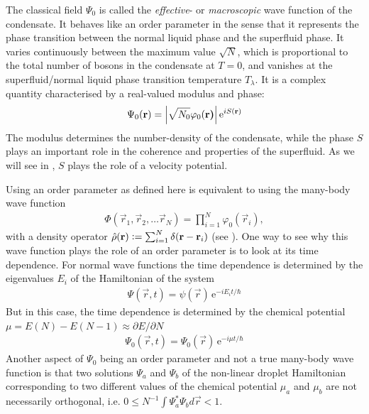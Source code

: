 			The classical field $\Psi_0$ is called the \emph{effective}- or \emph{macroscopic} wave function of the condensate. It behaves like an order parameter in the sense that it represents the phase transition between the normal liquid phase and the superfluid phase. It varies continuously between the maximum value $\sqrt{N}$, which is proportional to the total number of bosons in the condensate at $T=0$, and vanishes at the superfluid/normal liquid phase transition temperature $T_\lambda$. It is a complex quantity characterised by a real-valued modulus and phase:
			\begin{align}
				\Psi_0(\vec{r}) = \absolutevalue{\sqrt{N_0}\varphi_0(\vec{r)}}\,\mathrm{e}^{iS(\vec{r})}\label{eq:order-param-complex}
			\end{align}
			The modulus determines the number-density of the condensate, while the phase $S$ plays an important role in the coherence and properties of the superfluid. As we will see in , $S$ plays the role of a velocity potential.
			
			Using an order parameter as defined here is equivalent to using the many-body wave function
			\begin{align}
				\Phi(\vec{r}_1,\vec{r}_2,\ldots\vec{r}_N)=\prod_{i=1}^{N}\varphi_0(\vec{r}_i),
			\end{align}
			with a density operator $\hat{\rho}(\vec{r}) \vcentcolon= \sum_{i=1}^{N}\delta(\vec{r}-\vec{r}_i)$ (see ). One way to see why this wave function plays the role of an order parameter is to look at its time dependence. For normal wave functions the time dependence is determined by the eigenvalues $E_i$ of the Hamiltonian of the system
			\begin{align}
				\Psi(\vec{r},t)=\psi(\vec{r})\,\mathrm{e}^{-iE_it/\hbar}
			\end{align}
			But in this case, the time dependence is determined by the chemical potential $\mu=E(N)-E(N-1)\approx \partial E/\partial N$
			\begin{align}
				\Psi_0(\vec{r},t)=\Psi_0(\vec{r})\,\mathrm{e}^{-i\mu t/\hbar} \label{eq:td-order-param}
			\end{align}
			Another aspect of $\Psi_0$ being an order parameter and not a true many-body wave function is that two solutions $\Psi_a$ and $\Psi_b$ of the non-linear droplet Hamiltonian corresponding to two different values of the chemical potential $\mu_a$ and $\mu_b$ are not necessarily orthogonal, i.e. $0 \leq N^{-1}\int\!\Psi_a^*\Psi_b\unit{d}\vec{r} < 1$.%
			
